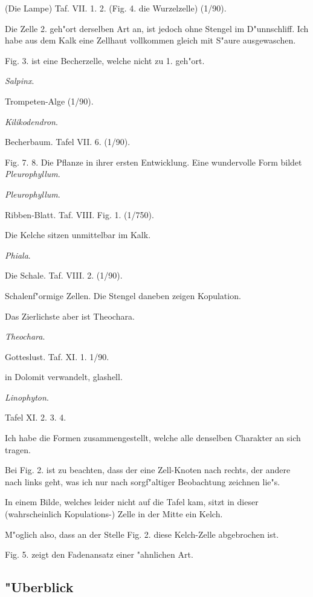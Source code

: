 \documentclass[a4paper, 11pt, oneside, german]{article}
\begin{document}
(Die Lampe) Taf. VII. 1. 2. (Fig. 4. die Wurzelzelle) (1/90).

Die Zelle 2. geh"ort derselben Art an, ist jedoch ohne Stengel im D"unnschliff. Ich habe aus dem Kalk eine Zellhaut vollkommen gleich mit S"aure ausgewaschen.

Fig. 3. ist eine Becherzelle, welche nicht zu 1. geh"ort.

\centerline{\emph{Salpinx}.}

Trompeten-Alge (1/90).

\centerline{\emph{Kilikodendron}.}

Becherbaum. Tafel VII. 6. (1/90).

Fig. 7. 8. Die Pflanze in ihrer ersten Entwicklung. Eine wundervolle Form bildet \emph{Pleurophyllum}.

\centerline{\emph{Pleurophyllum}.}

Ribben-Blatt. Taf. VIII. Fig. 1. (1/750).

Die Kelche sitzen unmittelbar im Kalk.

\centerline{\emph{Phiala}.}

Die Schale. Taf. VIII. 2. (1/90).

Schalenf"ormige Zellen. Die Stengel daneben zeigen Kopulation.

Das Zierlichste aber ist Theochara.

\centerline{\emph{Theochara}.}

Gotteslust. Taf. XI. 1. 1/90.

in Dolomit verwandelt, glashell.

\centerline{\emph{Linophyton}.}

Tafel XI. 2. 3. 4.

Ich habe die Formen zusammengestellt, welche alle denselben Charakter an sich tragen.

Bei Fig. 2. ist zu beachten, dass der eine Zell-Knoten nach rechts, der andere nach links geht, was ich nur nach sorgf"altiger Beobachtung zeichnen lie"s.

In einem Bilde, welches leider nicht auf die Tafel kam, sitzt in dieser (wahrscheinlich Kopulations-) Zelle in der Mitte ein Kelch.

M"oglich also, dass an der Stelle Fig. 2. diese Kelch-Zelle abgebrochen ist.

Fig. 5. zeigt den Fadenansatz einer "ahnlichen Art.
\clearpage
\subsection{"Uberblick}
\end{document}
